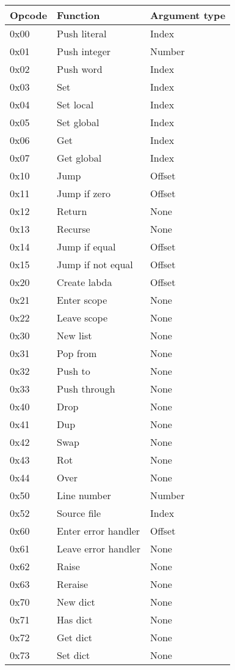 \begin{tabular}{lll}
\bfseries{Opcode} & \bfseries{Function} & \bfseries{Argument type} \\ \hline
0x00 & Push literal & Index \\
0x01 & Push integer & Number \\
0x02 & Push word & Index \\
0x03 & Set & Index \\
0x04 & Set local & Index \\
0x05 & Set global & Index \\
0x06 & Get & Index \\
0x07 & Get global & Index \\
0x10 & Jump & Offset \\
0x11 & Jump if zero & Offset \\
0x12 & Return & None \\
0x13 & Recurse & None \\
0x14 & Jump if equal & Offset \\
0x15 & Jump if not equal & Offset \\
0x20 & Create labda & Offset \\
0x21 & Enter scope & None \\
0x22 & Leave scope & None \\
0x30 & New list & None \\
0x31 & Pop from & None \\
0x32 & Push to & None \\
0x33 & Push through & None \\
0x40 & Drop & None \\
0x41 & Dup & None \\
0x42 & Swap & None \\
0x43 & Rot & None \\
0x44 & Over & None \\
0x50 & Line number & Number \\
0x52 & Source file & Index \\
0x60 & Enter error handler & Offset \\
0x61 & Leave error handler & None \\
0x62 & Raise & None \\
0x63 & Reraise & None \\
0x70 & New dict & None \\
0x71 & Has dict & None \\
0x72 & Get dict & None \\
0x73 & Set dict & None \\
\end{tabular}

